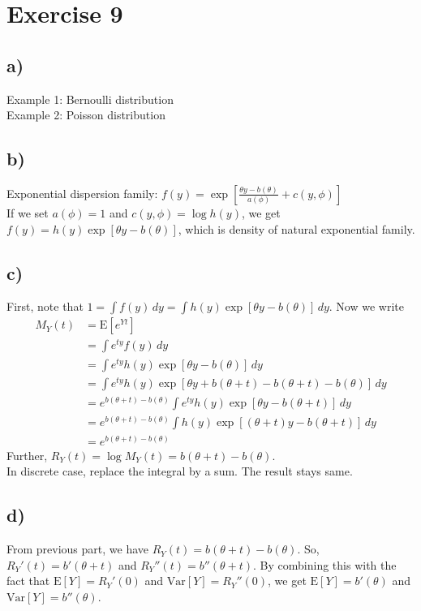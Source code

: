 \documentclass[a4paper]{article}
\newcommand{\E}{\mathrm{E}}
\newcommand{\Var}{\mathrm{Var}}
\begin{document}
\vspace{\baselineskip}
\section{Exercise 9}
\subsection{a)}
Example 1: Bernoulli distribution\\
Example 2: Poisson distribution\\

\subsection{b)}
Exponential dispersion family: $f(y) = \exp\left[\frac{\theta y - b(\theta)}{a(\phi)} + c(y,\phi)\right]$\\
If we set $a(\phi) = 1$ and $c(y,\phi) = \log h(y)$, we get $f(y) = h(y)\exp\left[\theta y -b(\theta)\right]$, which is density of natural exponential family.


\subsection{c)}
First, note that $1 = \int f(y) \,dy = \int h(y)\exp\left[\theta y -b(\theta)\right] \,dy$. Now we write
\begin{align*}
M_{Y}(t) &= \E\left[e^{Yt}\right]\\
&= \int e^{ty} f(y) \,dy\\
&= \int e^{ty} h(y)\exp\left[\theta y -b(\theta)\right] \,dy\\
&= \int e^{ty} h(y)\exp\left[\theta y + b(\theta + t) - b(\theta + t) -b(\theta)\right] \,dy\\
&= e^{b(\theta + t) -b(\theta)}\int e^{ty} h(y)\exp\left[\theta y -b(\theta + t)\right] \,dy\\
&= e^{b(\theta + t) -b(\theta)}\int h(y)\exp\left[(\theta +t)y -b(\theta + t)\right] \,dy\\
&= e^{b(\theta + t) -b(\theta)}
\end{align*}
Further, $R_{Y}(t) = \log M_{Y}(t) = b(\theta + t) -b(\theta)$.\\
In discrete case, replace the integral by a sum. The result stays same.

\subsection{d)}
From previous part, we have $R_{Y}(t) = b(\theta + t) -b(\theta)$.
So, $R_{Y}'(t) = b'(\theta + t)$ and $R_{Y}''(t) = b''(\theta + t)$. By combining this with the fact that $\E[Y] = R_{Y}'(0)$ and $\Var[Y] = R_{Y}''(0)$, we get $\E[Y] = b'(\theta)$ and  $\Var[Y] = b''(\theta)$.
\end{document}
